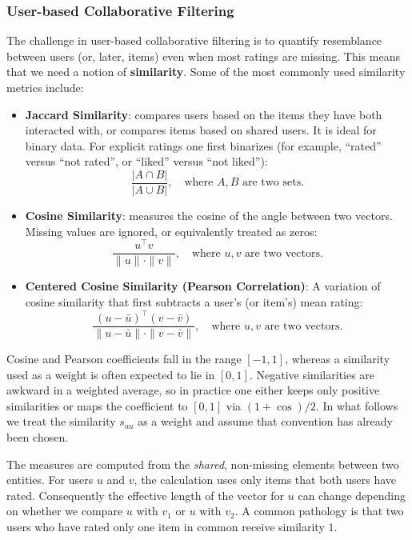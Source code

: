 \documentclass[
]{book}
\begin{document}
\subsubsection*{User-based Collaborative Filtering}\label{user-based-collaborative-filtering}

The challenge in user-based collaborative filtering is to quantify resemblance between users (or, later, items) even when most ratings are missing. This means that we need a notion of \textbf{similarity}. Some of the most commonly used similarity metrics include:

\begin{itemize}
\item
  \textbf{Jaccard Similarity}: compares users based on the items they have both interacted with, or compares items based on shared users. It is ideal for binary data. For explicit ratings one first binarizes (for example, ``rated'' versus ``not rated'', or ``liked'' versus ``not liked''):
  \[\frac{|A\cap B|}{|A\cup B|}, \quad \text{where } A, B \text{ are two sets.}\]
\item
  \textbf{Cosine Similarity}: measures the cosine of the angle between two vectors. Missing values are ignored, or equivalently treated as zeros:
  \[\frac{u^{\top} v}{\|u\| \cdot \|v\|}, \quad \text{where } u,v \text{ are two vectors.}\]
\item
  \textbf{Centered Cosine Similarity (Pearson Correlation)}:
  A variation of cosine similarity that first subtracts a user's (or item's) mean rating:
  \[\frac{(u-\bar{u})^{\top} (v-\bar{v})}{\|u-\bar{u}\| \cdot \|v-\bar{v}\|}, \quad \text{where } u,v \text{ are two vectors.}\]
\end{itemize}

Cosine and Pearson coefficients fall in the range \([-1, 1]\), whereas a similarity used as a weight is often expected to lie in \([0, 1]\). Negative similarities are awkward in a weighted average, so in practice one either keeps only positive similarities or maps the coefficient to \([0,1]\) via \((1+\cos)/2\). In what follows we treat the similarity \(s_{au}\) as a weight and assume that convention has already been chosen.

The measures are computed from the \emph{shared}, non-missing elements between two entities. For users \(u\) and \(v\), the calculation uses only items that both users have rated. Consequently the effective length of the vector for \(u\) can change depending on whether we compare \(u\) with \(v_1\) or \(u\) with \(v_2\). A common pathology is that two users who have rated only one item in common receive similarity \(1\).
\end{document}
